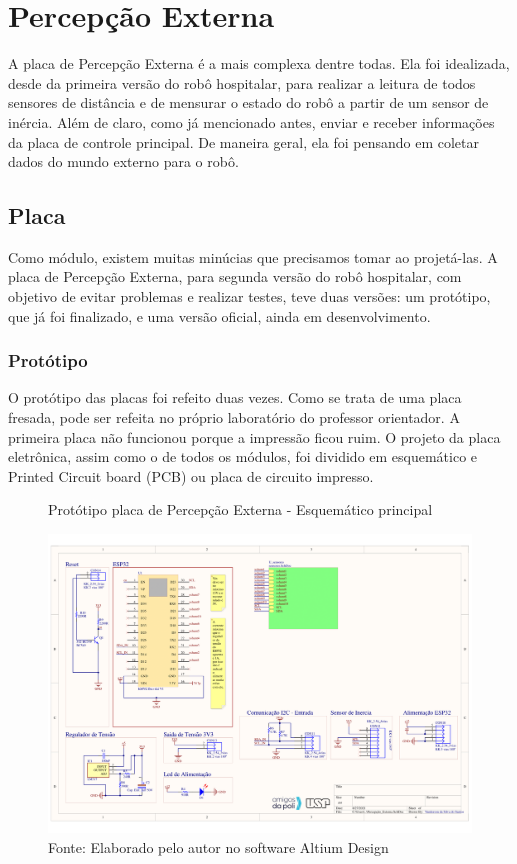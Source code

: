 \documentclass[../poliXuniversity_hospital_-USP-report.tex]{subfiles}
\begin{document}
\clearpage
\section{Percepção Externa}

A placa de Percepção Externa é a mais complexa dentre todas. Ela foi idealizada, desde da primeira versão do robô hospitalar, para realizar a leitura de todos sensores de distância e de mensurar o estado do robô a partir de um sensor de inércia. Além de claro, como já mencionado antes, enviar e receber informações da placa de controle principal. De maneira geral, ela foi pensando em coletar dados do mundo externo para o robô.

\subsection{Placa}

Como módulo, existem muitas minúcias que precisamos tomar ao projetá-las. A placa de Percepção Externa, para segunda versão do robô hospitalar, com objetivo de evitar problemas e realizar testes, teve duas versões: um protótipo, que já foi finalizado, e uma versão oficial, ainda em desenvolvimento. 

\subsubsection{Protótipo}

O protótipo das placas foi refeito duas vezes. Como se trata de uma placa fresada, pode ser refeita no próprio laboratório do professor orientador. A primeira placa não funcionou porque a impressão ficou ruim. O projeto da placa eletrônica, assim como o de todos os módulos, foi dividido em esquemático e Printed Circuit board (PCB)  ou placa de circuito impresso. 

\begin{figure}[!h]
\centering
    \caption{Protótipo placa de Percepção Externa - Esquemático principal }
    \centering %
    \includegraphics[width=17cm]{modulos/Percepção_Externa-1.png}
    \caption*{Fonte: Elaborado pelo autor no software Altium Design\cite{altium21} }
    \label{Protótipo placa de ## - Esquemático principal}
\end{figure}
\end{document}
